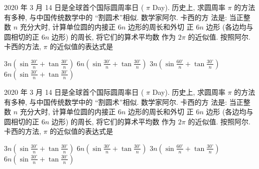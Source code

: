 \documentclass{ctexart}
\begin{document}
  2020 年 3 月 14 日是全球首个国际圆周率日 ( $\pi$ Day). 历史上, 求圆周率 $\pi$ 的方法有多种, 与中国传统数学中的 “割圆术”相似. 数学家阿尔. 卡西的方 法是: 当正整数 $n$ 充分大时, 计算单位圆的内接正 $6 n$ 边形的周长和外切 正 $6 n$ 边形 (各边均与圆相切的正 $6 n$ 边形) 的周长, 将它们的算术平均数 作为 $2 \pi$ 的近似值. 按照阿尔. 卡西的方法, $\pi$ 的近似值的表达式是 \paren
    \begin{xchoices*}[
      label-pos = top, items = 2, v-sep = 0em,
      h-offset = 6em, v-offset = 0em, showanswer
    ]
      \xitem*
      $3 n(\sin \frac{30^{\circ}}{n}+\tan \frac{30^{\circ}}{n})$
      \xitem
      $6 n(\sin \frac{30^{\circ}}{n}+\tan \frac{30^{\circ}}{n})$
      \xitem*
      $3 n(\sin \frac{60^{\circ}}{n}+\tan \frac{30^{\circ}}{n})$
      \xitem
      $6 n(\sin \frac{30^{\circ}}{n}+\tan \frac{30^{\circ}}{n})$ 
    \end{xchoices*}
    2020 年 3 月 14 日是全球首个国际圆周率日 ( $\pi$ Day). 历史上, 求圆周率 $\pi$ 的方法有多种, 与中国传统数学中的 “割圆术”相似. 数学家阿尔. 卡西的方 法是: 当正整数 $n$ 充分大时, 计算单位圆的内接正 $6 n$ 边形的周长和外切 正 $6 n$ 边形 (各边均与圆相切的正 $6 n$ 边形) 的周长, 将它们的算术平均数 作为 $2 \pi$ 的近似值. 按照阿尔. 卡西的方法, $\pi$ 的近似值的表达式是 \paren
    \begin{xchoices*}[
      label-pos = top, items = 2, v-sep = 0em,
      h-offset = 6em, v-offset = 0em, showanswer
    ]
      \xitem
      $3 n(\sin \frac{30^{\circ}}{n}+\tan \frac{30^{\circ}}{n})$
      \xitem*
      $6 n(\sin \frac{30^{\circ}}{n}+\tan \frac{30^{\circ}}{n})$
      \xitem*
      $3 n(\sin \frac{60^{\circ}}{n}+\tan \frac{30^{\circ}}{n})$
      \xitem
      $6 n(\sin \frac{30^{\circ}}{n}+\tan \frac{30^{\circ}}{n})$ 
    \end{xchoices*}
\end{document}
